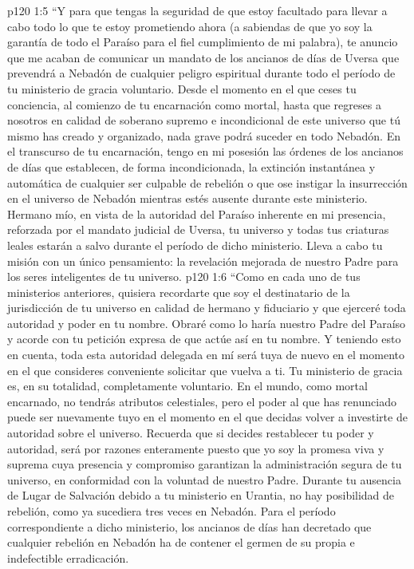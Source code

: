 \vs p120 1:5 “Y para que tengas la seguridad de que estoy facultado para llevar a cabo todo lo que te estoy prometiendo ahora (a sabiendas de que yo soy la garantía de todo el Paraíso para el fiel cumplimiento de mi palabra), te anuncio que me acaban de comunicar un mandato de los ancianos de días de Uversa que prevendrá a Nebadón de cualquier peligro espiritual durante todo el período de tu ministerio de gracia voluntario. Desde el momento en el que ceses tu conciencia, al comienzo de tu encarnación como mortal, hasta que regreses a nosotros en calidad de soberano supremo e incondicional de este universo que tú mismo has creado y organizado, nada grave podrá suceder en todo Nebadón. En el transcurso de tu encarnación, tengo en mi posesión las órdenes de los ancianos de días que establecen, de forma incondicionada, la extinción instantánea y automática de cualquier ser culpable de rebelión o que ose instigar la insurrección en el universo de Nebadón mientras estés ausente durante este ministerio. Hermano mío, en vista de la autoridad del Paraíso inherente en mi presencia, reforzada por el mandato judicial de Uversa, tu universo y todas tus criaturas leales estarán a salvo durante el período de dicho ministerio. Lleva a cabo tu misión con un único pensamiento: la revelación mejorada de nuestro Padre para los seres inteligentes de tu universo.
\vs p120 1:6 “Como en cada uno de tus ministerios anteriores, quisiera recordarte que soy el destinatario de la jurisdicción de tu universo en calidad de hermano y fiduciario y que ejerceré toda autoridad y poder en tu nombre. Obraré como lo haría nuestro Padre del Paraíso y acorde con tu petición expresa de que actúe así en tu nombre. Y teniendo esto en cuenta, toda esta autoridad delegada en mí será tuya de nuevo en el momento en el que consideres conveniente solicitar que vuelva a ti. Tu ministerio de gracia es, en su totalidad, completamente voluntario. En el mundo, como mortal encarnado, no tendrás atributos celestiales, pero el poder al que has renunciado puede ser nuevamente tuyo en el momento en el que decidas volver a investirte de autoridad sobre el universo. Recuerda que si decides restablecer tu poder y autoridad, será por razones enteramente  puesto que yo soy la promesa viva y suprema cuya presencia y compromiso garantizan la administración segura de tu universo, en conformidad con la voluntad de nuestro Padre. Durante tu ausencia de Lugar de Salvación debido a tu ministerio en Urantia, no hay posibilidad de rebelión, como ya sucediera tres veces en Nebadón. Para el período correspondiente a dicho ministerio, los ancianos de días han decretado que cualquier rebelión en Nebadón ha de contener el germen de su propia e indefectible erradicación.
